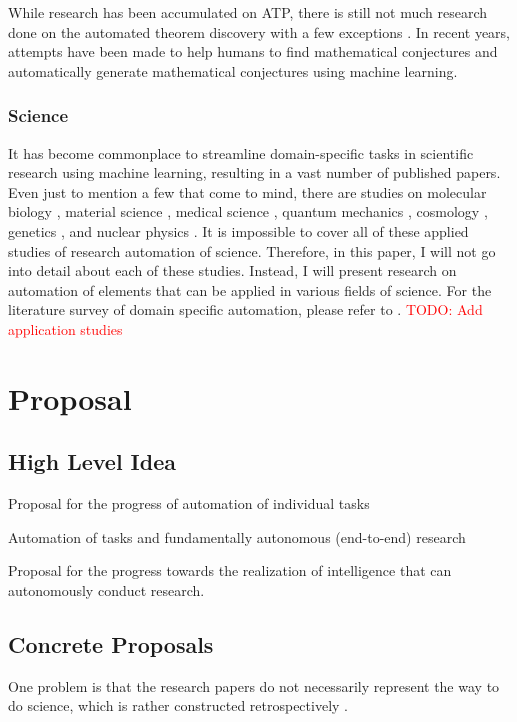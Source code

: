 \documentclass{book}
\begin{document}
 While research has been accumulated on ATP, there is still not much research done on the automated theorem discovery with a few exceptions \cite{gao2014systematic}. In recent years, attempts have been made to help humans to find mathematical conjectures \cite{davies2021advancing} and
 automatically generate mathematical conjectures \cite{raayoni2021generating}  using machine learning.

\subsection{Science}


It has become commonplace to streamline domain-specific tasks in scientific research using machine learning, resulting in a vast number of published papers. Even just to mention a few that come to mind, there are studies on molecular biology \cite{jumper2021highly,senior2020improved}, material science \cite{ramprasad2017machine}, medical science \cite{vamathevan2019applications,shorten2021deep}, quantum mechanics \cite{carleo2017solving}, cosmology \cite{carleo2019machine}, genetics \cite{libbrecht2015machine}, and nuclear physics \cite{degrave2022magnetic}. It is impossible to cover all of these applied studies of research automation of science. Therefore, in this paper, I will not go into detail about each of these studies. Instead, I will present research on automation of elements that can be applied in various fields of science. For the literature survey of domain specific automation, please refer to \cite{xu2021artificial}. \textcolor{red}{TODO: Add application studies}



\chapter{Proposal}

\section{High Level Idea}

Proposal for the progress of automation of individual tasks

Automation of tasks and fundamentally autonomous (end-to-end) research

Proposal for the progress towards the realization of intelligence that can autonomously conduct research.

\section{Concrete Proposals}
One problem is that the research papers do not necessarily represent the way to do science, which is rather constructed retrospectively \cite{schickore2008doing}.
\end{document}
